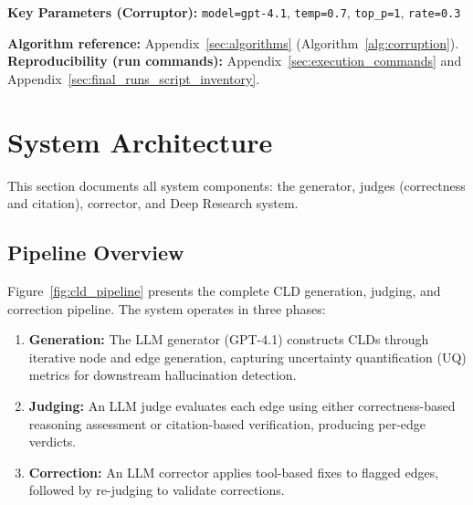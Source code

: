 \textbf{Key Parameters (Corruptor):} \texttt{model=gpt-4.1}, \texttt{temp=0.7}, \texttt{top\_p=1}, \texttt{rate=0.3}

\textbf{Algorithm reference:} Appendix~\ref{sec:algorithms} (Algorithm~\ref{alg:corruption}). \textbf{Reproducibility (run commands):} Appendix~\ref{sec:execution_commands} and Appendix~\ref{sec:final_runs_script_inventory}.

\section{System Architecture}
\label{sec:system_architecture}

This section documents all system components: the generator, judges (correctness and citation), corrector, and Deep Research system.

\subsection{Pipeline Overview}
\label{sec:methods_system_overview}

Figure~\ref{fig:cld_pipeline} presents the complete CLD generation, judging, and correction pipeline. The system operates in three phases:

\begin{enumerate}[noitemsep]
    \item \textbf{Generation:} The LLM generator (GPT-4.1) constructs CLDs through iterative node and edge generation, capturing uncertainty quantification (UQ) metrics for downstream hallucination detection.
    \item \textbf{Judging:} An LLM judge evaluates each edge using either correctness-based reasoning assessment or citation-based verification, producing per-edge verdicts.
    \item \textbf{Correction:} An LLM corrector applies tool-based fixes to flagged edges, followed by re-judging to validate corrections.
\end{enumerate}

